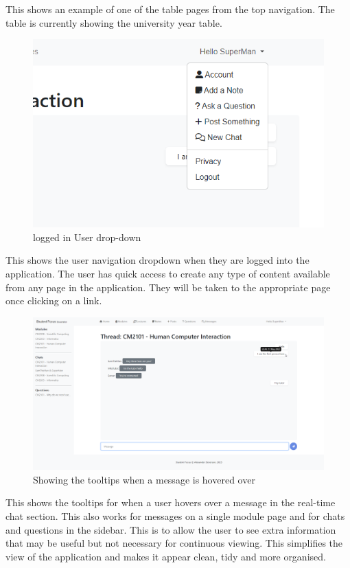 This shows an example of one of the table pages from the top navigation. The table is currently showing the university year table.

\begin{figure}[H]
\centering
\includegraphics[scale=0.50]{images/application/55 - nav_user_dropdwon.png}
\caption{logged in User drop-down}
\label{fig:figure2}
\end{figure}

This shows the user navigation dropdown when they are logged into the application. The user has quick access to create any type of content available from any page in the application. They will be taken to the appropriate page once clicking on a link.

\begin{figure}[H]
\centering
\includegraphics[scale=0.27]{images/application/59 - message_hover.png}
\caption{Showing the tooltips when a message is hovered over}
\label{fig:figure2}
\end{figure}

This shows the tooltips for when a user hovers over a message in the real-time chat section. This also works for messages on a single module page and for chats and questions in the sidebar. This is to allow the user to see extra information that may be useful but not necessary for continuous viewing. This simplifies the view of the application and makes it appear clean, tidy and more organised.

